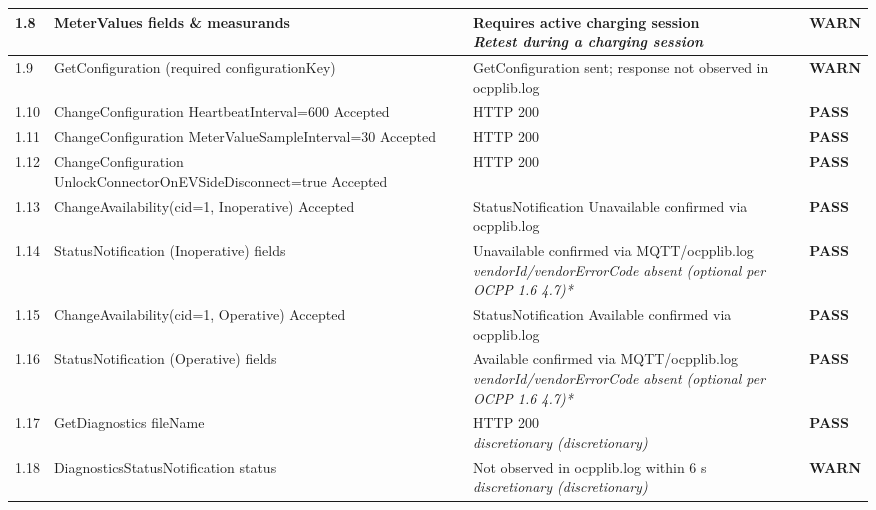 \documentclass[10pt, a4paper]{article}
\begin{document}
\begin{longtable}{|L{1cm}|L{5.5cm}|M{7cm}|C{1.8cm}|}
\hline
\small 1.8 & \small MeterValues fields \& measurands & Requires active charging session{\newline\normalfont\footnotesize\itshape Retest during a charging session} & \textcolor{warnorange}{\textbf{WARN}} \\
\hline
\small 1.9 & \small GetConfiguration (required configurationKey) & GetConfiguration sent; response not observed in ocpplib.log & \textcolor{warnorange}{\textbf{WARN}} \\
\hline
\small 1.10 & \small ChangeConfiguration HeartbeatInterval=600  Accepted & HTTP 200 & \textcolor{passgreen}{\textbf{PASS}} \\
\hline
\small 1.11 & \small ChangeConfiguration MeterValueSampleInterval=30  Accepted & HTTP 200 & \textcolor{passgreen}{\textbf{PASS}} \\
\hline
\small 1.12 & \small ChangeConfiguration UnlockConnectorOnEVSideDisconnect=true  Accepted & HTTP 200 & \textcolor{passgreen}{\textbf{PASS}} \\
\hline
\small 1.13 & \small ChangeAvailability(cid=1, Inoperative)  Accepted & StatusNotification Unavailable confirmed via ocpplib.log & \textcolor{passgreen}{\textbf{PASS}} \\
\hline
\small 1.14 & \small StatusNotification (Inoperative) fields & Unavailable confirmed via MQTT/ocpplib.log{\newline\normalfont\footnotesize\itshape vendorId/vendorErrorCode absent (optional per OCPP 1.6 4.7)*} & \textcolor{passgreen}{\textbf{PASS}} \\
\hline
\small 1.15 & \small ChangeAvailability(cid=1, Operative)  Accepted & StatusNotification Available confirmed via ocpplib.log & \textcolor{passgreen}{\textbf{PASS}} \\
\hline
\small 1.16 & \small StatusNotification (Operative) fields & Available confirmed via MQTT/ocpplib.log{\newline\normalfont\footnotesize\itshape vendorId/vendorErrorCode absent (optional per OCPP 1.6 4.7)*} & \textcolor{passgreen}{\textbf{PASS}} \\
\hline
\small 1.17 & \small GetDiagnostics  fileName & HTTP 200{\newline\normalfont\footnotesize\itshape *discretionary (discretionary)} & \textcolor{passgreen}{\textbf{PASS}} \\
\hline
\small 1.18 & \small DiagnosticsStatusNotification  status & Not observed in ocpplib.log within 6 s{\newline\normalfont\footnotesize\itshape *discretionary (discretionary)} & \textcolor{warnorange}{\textbf{WARN}} \\

\end{longtable}
\end{document}
